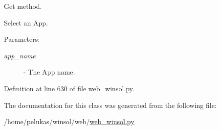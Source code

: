 Get method. 

Select an App.

\begin{Desc}
\item[Parameters:]
\begin{description}
\item[{\em app\_\-name}]- The App name. \end{description}
\end{Desc}


Definition at line 630 of file web\_\-winsol.py.

The documentation for this class was generated from the following file:\begin{CompactItemize}
\item 
/home/pelukas/winsol/web/\hyperlink{web__winsol_8py}{web\_\-winsol.py}\end{CompactItemize}
